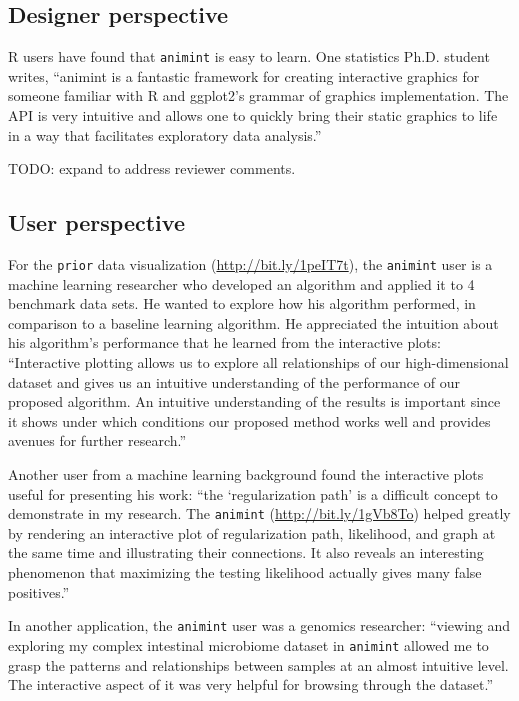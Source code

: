\documentclass[journal]{vgtc}\usepackage[]{graphicx}\usepackage[]{color}
\begin{document}
\subsection{Designer perspective}

R users have found that \texttt{animint} is easy to learn. One statistics
Ph.D. student writes, ``animint is a fantastic framework for creating
interactive graphics for someone familiar with R and ggplot2's grammar
of graphics implementation. The API is very intuitive and allows one
to quickly bring their static graphics to life in a way that
facilitates exploratory data analysis.''

TODO: expand to address reviewer comments.

\subsection{User perspective}

For the \texttt{prior} data visualization
(\url{http://bit.ly/1peIT7t}), the \texttt{animint} user is a machine learning
researcher who developed an algorithm and applied it to 4 benchmark
data sets. He wanted to explore how his algorithm performed, in
comparison to a baseline learning algorithm. He appreciated the
intuition about his algorithm's performance that he learned from the
interactive plots: ``Interactive plotting allows us to explore all
relationships of our high-dimensional dataset and gives us an
intuitive understanding of the performance of our proposed
algorithm. An intuitive understanding of the results is important
since it shows under which conditions our proposed method works well
and provides avenues for further research.''

Another user from a machine learning background found the interactive
plots useful for presenting his work: ``the `regularization path' is a
difficult concept to demonstrate in my research. The \texttt{animint}
(\url{http://bit.ly/1gVb8To}) helped greatly by rendering an
interactive plot of regularization path, likelihood, and graph at the
same time and illustrating their connections. It also reveals an
interesting phenomenon that maximizing the testing likelihood actually
gives many false positives.''

In another application, the \texttt{animint} user was a genomics researcher:
``viewing and exploring my complex intestinal microbiome dataset in
\texttt{animint} allowed me to grasp the patterns and relationships between
samples at an almost intuitive level. The interactive aspect of it was
very helpful for browsing through the dataset.''
\end{document}

